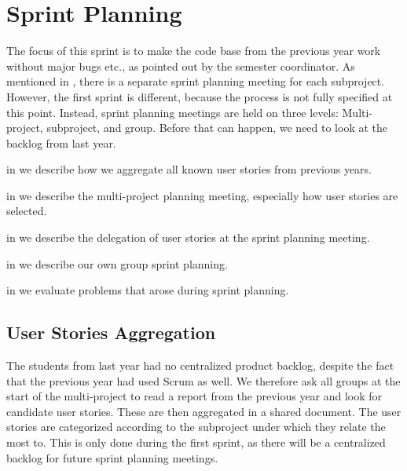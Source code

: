 \chapter{Sprint Planning}\label{chap:sprint1_planning}
The focus of this sprint is to make the code base from the previous year work without major bugs etc., as pointed out by the semester coordinator. As mentioned in , there is a separate sprint planning meeting for each subproject. However, the first sprint is different, because the process is not fully specified at this point. Instead, sprint planning meetings are held on three levels: Multi-project, subproject, and group. Before that can happen, we need to look at the backlog from last year.

\begin{chapterorganization}
  \item in  we describe how we aggregate all known user stories from previous years.
  \item in  we describe the multi-project planning meeting, especially how user stories are selected.
  \item in  we describe the delegation of user stories at the \bd sprint planning meeting.
  \item in  we describe our own group sprint planning.
  \item in  we evaluate problems that arose during sprint planning.
\end{chapterorganization}

\section{User Stories Aggregation}\label{sec:s1p_userstory}
The students from last year had no centralized product backlog, despite the fact that the previous year had used Scrum as well. We therefore ask all groups at the start of the multi-project to read a report from the previous year and look for candidate user stories. These are then aggregated in a shared document. The user stories are categorized according to the subproject under which they relate the most to. This is only done during the first sprint, as there will be a centralized backlog for future sprint planning meetings.

